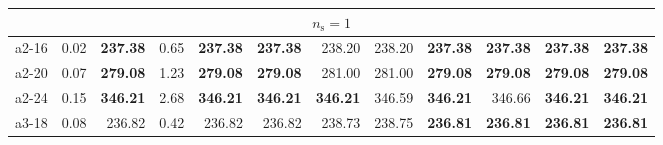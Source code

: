 \documentclass[aspectratio=1610]{beamer}
\begin{document}
\begin{frame}
\begin{table}[]
{\begin{tabular}{lrrrrrrrrrrr}
\multicolumn{12}{c}{$n_\mathrm{s} = 1$}                                                                                                                                                                                                                                                                                                                                                                                                                                                                                                                         \\ \hline
a2-16                                          & 0.02                                                    & \multicolumn{1}{r|}{\textbf{237.38}} & 0.65                                                         & \textbf{237.38} & \multicolumn{1}{r|}{{\color[HTML]{FE0000} \textbf{237.38}}} & 238.20              & \multicolumn{1}{r|}{238.20}                                    & \textbf{237.38}   & \multicolumn{1}{r|}{{\color[HTML]{FE0000} \textbf{237.38}}}  & \textbf{237.38}               & {\color[HTML]{FE0000} \textbf{237.38}}               \\
a2-20                                          & 0.07                                                    & \multicolumn{1}{r|}{\textbf{279.08}} & 1.23                                                         & \textbf{279.08} & \multicolumn{1}{r|}{{\color[HTML]{FE0000} \textbf{279.08}}} & 281.00              & \multicolumn{1}{r|}{281.00}                                    & \textbf{279.08}   & \multicolumn{1}{r|}{{\color[HTML]{FE0000} \textbf{279.08}}}  & \textbf{279.08}               & {\color[HTML]{FE0000} \textbf{279.08}}               \\
a2-24                                          & 0.15                                                    & \multicolumn{1}{r|}{\textbf{346.21}} & 2.68                                                         & \textbf{346.21} & \multicolumn{1}{r|}{{\color[HTML]{FE0000} \textbf{346.21}}} & \textbf{346.21}     & \multicolumn{1}{r|}{346.59}                                    & \textbf{346.21}   & \multicolumn{1}{r|}{346.66}                                  & \textbf{346.21}               & {\color[HTML]{FE0000} \textbf{346.21}}               \\
a3-18                                          & 0.08                                                    & \multicolumn{1}{r|}{236.82}          & 0.42                                                         & 236.82          & \multicolumn{1}{r|}{236.82}                                 & 238.73              & \multicolumn{1}{r|}{238.75}                                    & \textbf{236.81}   & \multicolumn{1}{r|}{{\color[HTML]{FE0000} \textbf{236.81}}}  & \textbf{236.81}               & {\color[HTML]{FE0000} \textbf{236.81}}               \\

\end{tabular}}
\end{table}
\end{frame}
\end{document}
